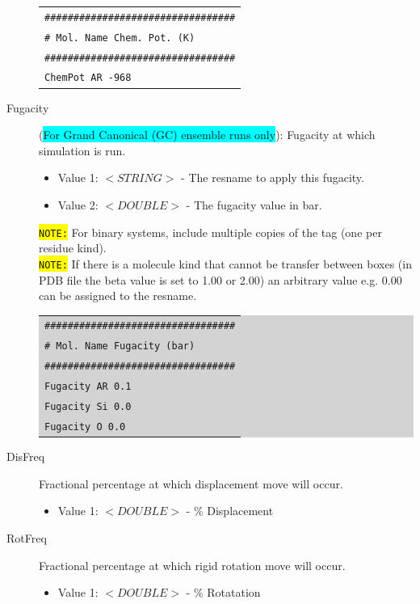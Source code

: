 \begin{description}
{\begin{tabular}{l}
	\texttt{\#\#\#\#\#\#\#\#\#\#\#\#\#\#\#\#\#\#\#\#\#\#\#\#\#\#\#\#\#\#\#\#\#}\\
	\texttt{\#  Mol. Name    Chem. Pot. (K)}\\
	\texttt{\#\#\#\#\#\#\#\#\#\#\#\#\#\#\#\#\#\#\#\#\#\#\#\#\#\#\#\#\#\#\#\#\#}\\
	\texttt{ChemPot        AR               -968}\\
	\end{tabular}}
\item [Fugacity] (\colorbox{cyan}{For Grand Canonical (GC) ensemble runs only}): Fugacity at which simulation is run.
	\begin{itemize}
	\item Value 1: $<STRING>$ - The resname to apply this fugacity.
	\item Value 2: $<DOUBLE>$ - The fugacity value in bar.
	\end{itemize}
	\colorbox{yellow}{\texttt{NOTE:}} For binary systems, include multiple copies of the tag (one per residue kind).\\
	\colorbox{yellow}{\texttt{NOTE:}} If there is a molecule kind that cannot be transfer between boxes (in PDB file the beta value is set to 1.00 or 2.00) an arbitrary value e.g. 0.00 can be assigned to the resname.\\
	\colorbox{lightgray}{
	\begin{tabular}{l}
	\texttt{\#\#\#\#\#\#\#\#\#\#\#\#\#\#\#\#\#\#\#\#\#\#\#\#\#\#\#\#\#\#\#\#\#}\\
	\texttt{\#  Mol. Name    Fugacity (bar)}\\
	\texttt{\#\#\#\#\#\#\#\#\#\#\#\#\#\#\#\#\#\#\#\#\#\#\#\#\#\#\#\#\#\#\#\#\#}\\
	\texttt{Fugacity        AR               0.1}\\
	\texttt{Fugacity        Si                0.0}\\
  	\texttt{Fugacity        O                0.0}\\
	\end{tabular}}
\item [DisFreq] Fractional percentage at which displacement move will occur.
	\begin{itemize}
	\item Value 1: $<DOUBLE>$ - \% Displacement
	\end{itemize}
\item [RotFreq] Fractional percentage at which rigid rotation move will occur.
	\begin{itemize}
	\item Value 1: $<DOUBLE>$ - \% Rotatation

\end{itemize}
\end{description}
